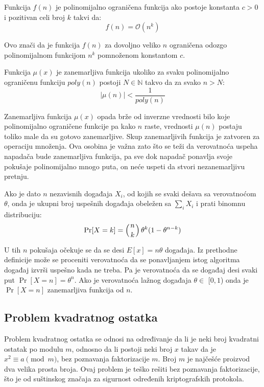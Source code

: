 \begin{definition}
	Funkcija $f(n)$ je polinomijalno ograničena funkcija ako postoje konstanta $c>0$ i pozitivan celi broj $k$ takvi da:
	$$f(n)={\mathcal {O}}(n^{k})$$
\end{definition}

Ovo znači da je funkcija $f(n)$ za dovoljno veliko $n$ ograničena odozgo polinomijalnom funkcijom $n^{k}$ pomnoženom konstantom $c$.

\begin{definition}
	Funkcija $\mu (x)$ je zanemarljiva funkcija ukoliko za svaku polinomijalno ograničenu funkciju $poly(n)$ postoji $N \in \mathbb{N}$ takvo da za svako $n > N$:
	$$|\mu(n)|< \frac{1}{poly(n)}$$
\end{definition}

Zanemarljiva funkcija  $\mu (x)$ opada brže od inverzne vrednosti bilo koje polinomijalno ograničene funkcije pa kako $n$ raste, vrednosti $\mu(n)$ postaju toliko male da su gotovo zanemarljive. Skup zanemarljivih funkcija je zatvoren za operaciju množenja. Ova osobina je važna zato što se teži da verovatnoća uspeha napadača bude zanemarljiva funkcija, pa sve dok napadač ponavlja svoje pokušaje polinomijalno mnogo puta, on neće uspeti da stvori nezanemarljivu pretnju.

\begin{definition}
	Ako je dato $n$ nezavisnih događaja $X_{i}$, od kojih se svaki dešava sa verovatnoćom $\theta$, onda je ukupni broj uspešnih događaja obeležen sa $\sum_{i} X_{i}$ i prati binomnu distribuciju:
	$$\Pr[X=k] = \left ({n \atop k}\right )\theta^{k}(1-\theta^{n-k})$$
\end{definition}

U tih $n$ pokušaja očekuje se da se desi $E[x]=n\theta$ događaja. Iz prethodne definicije može se proceniti verovatnoća da se ponavljanjem istog algoritma događaj izvrši uspešno kada ne treba.  Pa je verovatnoća da se događaj desi svaki put $\Pr[X=n] = \theta^{n}$. Ako je verovatnoća lažnog događaja $\theta \in$ [$0,1$) onda je $\Pr[X=n]$ zanemarljiva funkcija od $n$.

\subsection{Problem kvadratnog ostatka}
Problem kvadratnog ostatka se odnosi na određivanje da li je neki broj kvadratni ostatak po modulu $m$, odnosno da li postoji neki broj $x$ takav da je $x^{2} \equiv a \pmod  m$, bez poznavanja faktorizacije $m$. Broj $m$ je najčešće proizvod dva velika prosta broja. Ovaj problem je teško rešiti bez poznavanja faktorizacije, što je od suštinskog značaja za sigurnost određenih kriptografskih protokola.

